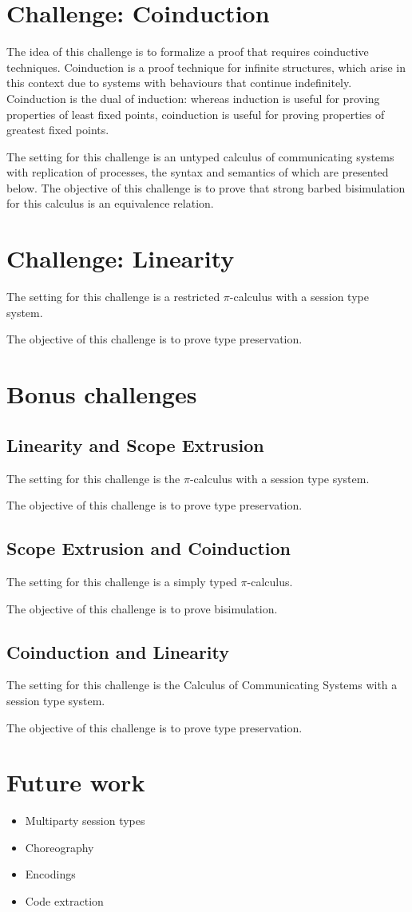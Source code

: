 \documentclass[a4paper]{article}
\begin{document}
\section{Challenge: Coinduction}
The idea of this challenge is to formalize a proof that requires coinductive techniques.
Coinduction is a proof technique for infinite structures, which arise in this context due to systems with behaviours that continue indefinitely.
Coinduction is the dual of induction: whereas induction is useful for proving properties of least fixed points, coinduction is useful for proving properties of greatest fixed points.

The setting for this challenge is an untyped calculus of communicating systems with replication of processes, the syntax and semantics of which are presented below.
The objective of this challenge is to prove that strong barbed bisimulation for this calculus is an equivalence relation.

\section{Challenge: Linearity}
The setting for this challenge is a restricted \( \pi \)-calculus with a session type system.

The objective of this challenge is to prove type preservation.

\section{Bonus challenges}

\subsection{Linearity and Scope Extrusion}
The setting for this challenge is the \( \pi \)-calculus with a session type system.

The objective of this challenge is to prove type preservation.

\subsection{Scope Extrusion and Coinduction}
The setting for this challenge is a simply typed \( \pi \)-calculus.

The objective of this challenge is to prove bisimulation.

\subsection{Coinduction and Linearity}
The setting for this challenge is the Calculus of Communicating Systems with a session type system.

The objective of this challenge is to prove type preservation.

\section{Future work}
\begin{itemize}
\item Multiparty session types
\item Choreography
\item Encodings
\item Code extraction
\end{itemize}
\end{document}
